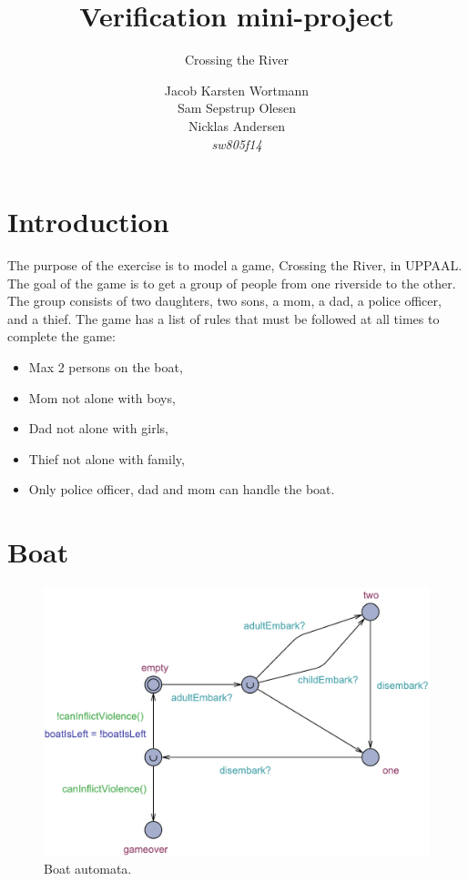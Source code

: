 \documentclass[a4paper,12pt]{scrartcl}
\title{Verification mini-project}
\subtitle{Crossing the River}
\author{Jacob Karsten Wortmann\\Sam Sepstrup Olesen\\Nicklas Andersen\\\textit{sw805f14}}
\begin{document}
\maketitle %

\section*{Introduction}
The purpose of the exercise is to model a game, Crossing the River, in UPPAAL. The goal of the game is to get a group of people from one riverside to the other. The group consists of two daughters, two sons, a mom, a dad, a police officer, and a thief.
The game has a list of rules that must be followed at all times to complete the game:

\begin{itemize}
\item Max 2 persons on the boat,
\item Mom not alone with boys,
\item Dad not alone with girls,
\item Thief not alone with family,
\item Only police officer, dad and mom can handle the boat.
\end{itemize}

\section*{Boat}
\begin{figure}[h!]
\centering
\includegraphics[width=\linewidth]{Boat.pdf}
\caption{Boat automata.}
\label{fig:boat}
\end{figure}
\end{document}
